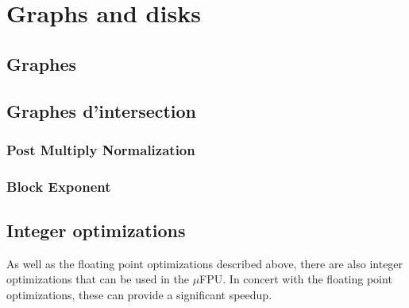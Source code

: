 \chapter{Graphs and disks}


\section{Graphes}


\section{Graphes d'intersection}\label{ch1:opts}

\subsection{Post Multiply Normalization}


%

\subsection{Block Exponent}


%

\section{Integer optimizations}

As well as the floating point optimizations described above, there are
also integer optimizations that can be used in the $\mu$FPU.  In concert
with the floating point optimizations, these can provide a significant
speedup.

